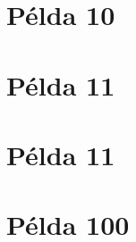 \section{Példa 10}
\label{sec:example10}



\section{Példa 11}
\label{sec:example11}



\section{Példa 11}
\label{sec:example11}



\section{Példa 100}
\label{sec:example100}


